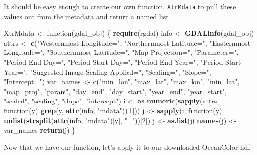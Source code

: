 \documentclass[]{article}
\newenvironment{Shaded}{}{}
\newcommand{\KeywordTok}[1]{\textcolor[rgb]{0.00,0.44,0.13}{\textbf{{#1}}}}
\newcommand{\DecValTok}[1]{\textcolor[rgb]{0.25,0.63,0.44}{{#1}}}
\newcommand{\StringTok}[1]{\textcolor[rgb]{0.25,0.44,0.63}{{#1}}}
\newcommand{\NormalTok}[1]{{#1}}
\begin{document}
It should be easy enough to create our own function, \texttt{XtrMdata}
to pull these values out from the metadata and return a named list

\begin{Shaded}
\begin{Highlighting}[]
\NormalTok{XtrMdata <- function(gdal_obj) \{}
    \KeywordTok{require}\NormalTok{(rgdal)}
    \NormalTok{info <- }\KeywordTok{GDALinfo}\NormalTok{(gdal_obj)}
    \NormalTok{attrs <- }\KeywordTok{c}\NormalTok{(}\StringTok{"Westernmost Longitude="}\NormalTok{, }\StringTok{"Northernmost Latitude="}\NormalTok{, }\StringTok{"Easternmost Longitude="}\NormalTok{, }
        \StringTok{"Southernmost Latitude="}\NormalTok{, }\StringTok{"Map Projection="}\NormalTok{, }\StringTok{"Parameter="}\NormalTok{, }\StringTok{"Period End Day="}\NormalTok{, }
        \StringTok{"Period Start Day="}\NormalTok{, }\StringTok{"Period End Year="}\NormalTok{, }\StringTok{"Period Start Year="}\NormalTok{, }\StringTok{"Suggested Image Scaling Applied="}\NormalTok{, }
        \StringTok{"Scaling="}\NormalTok{, }\StringTok{"Slope="}\NormalTok{, }\StringTok{"Intercept="}\NormalTok{)}
    \NormalTok{var_names <- }\KeywordTok{c}\NormalTok{(}\StringTok{"min_lon"}\NormalTok{, }\StringTok{"max_lat"}\NormalTok{, }\StringTok{"max_lon"}\NormalTok{, }\StringTok{"min_lat"}\NormalTok{, }\StringTok{"map_proj"}\NormalTok{, }\StringTok{"param"}\NormalTok{, }
        \StringTok{"day_end"}\NormalTok{, }\StringTok{"day_start"}\NormalTok{, }\StringTok{"year_end"}\NormalTok{, }\StringTok{"year_start"}\NormalTok{, }\StringTok{"scaled"}\NormalTok{, }\StringTok{"scaling"}\NormalTok{, }
        \StringTok{"slope"}\NormalTok{, }\StringTok{"intercept"}\NormalTok{)}
    \NormalTok{i <- }\KeywordTok{as.numeric}\NormalTok{(}\KeywordTok{sapply}\NormalTok{(attrs, function(y) }\KeywordTok{grep}\NormalTok{(y, }\KeywordTok{attr}\NormalTok{(info, }\StringTok{"mdata"}\NormalTok{))[}\DecValTok{1}\NormalTok{]))}
    \NormalTok{j <- }\KeywordTok{sapply}\NormalTok{(i, function(y) }\KeywordTok{unlist}\NormalTok{(}\KeywordTok{strsplit}\NormalTok{(}\KeywordTok{attr}\NormalTok{(info, }\StringTok{"mdata"}\NormalTok{)[y], }\StringTok{"="}\NormalTok{))[}\DecValTok{2}\NormalTok{])}
    \NormalTok{j <- }\KeywordTok{as.list}\NormalTok{(j)}
    \KeywordTok{names}\NormalTok{(j) <- var_names}
    \KeywordTok{return}\NormalTok{(j)}
\NormalTok{\}}
\end{Highlighting}
\end{Shaded}
Now that we have our function, let's apply it to our downloaded
OceanColor hdf
\end{document}
